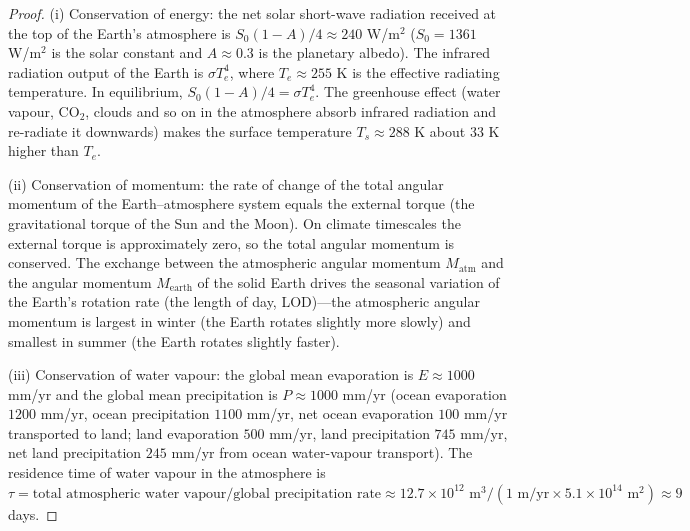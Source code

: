 \begin{proof}
(i) Conservation of energy: the net solar short-wave radiation received at the top of the Earth's atmosphere is $S_0(1-A)/4 \approx 240$ W/m$^2$ ($S_0 = 1361$ W/m$^2$ is the solar constant and $A \approx 0.3$ is the planetary albedo). The infrared radiation output of the Earth is $\sigma T_e^4$, where $T_e \approx 255$ K is the effective radiating temperature. In equilibrium, $S_0(1-A)/4 = \sigma T_e^4$. The greenhouse effect (water vapour, CO$_2$, clouds and so on in the atmosphere absorb infrared radiation and re-radiate it downwards) makes the surface temperature $T_s \approx 288$ K about $33$ K higher than $T_e$.

(ii) Conservation of momentum: the rate of change of the total angular momentum of the Earth--atmosphere system equals the external torque (the gravitational torque of the Sun and the Moon). On climate timescales the external torque is approximately zero, so the total angular momentum is conserved. The exchange between the atmospheric angular momentum $M_{\text{atm}}$ and the angular momentum $M_{\text{earth}}$ of the solid Earth drives the seasonal variation of the Earth's rotation rate (the length of day, LOD)---the atmospheric angular momentum is largest in winter (the Earth rotates slightly more slowly) and smallest in summer (the Earth rotates slightly faster).

(iii) Conservation of water vapour: the global mean evaporation is $E \approx 1000$ mm/yr and the global mean precipitation is $P \approx 1000$ mm/yr (ocean evaporation $1200$ mm/yr, ocean precipitation $1100$ mm/yr, net ocean evaporation $100$ mm/yr transported to land; land evaporation $500$ mm/yr, land precipitation $745$ mm/yr, net land precipitation $245$ mm/yr from ocean water-vapour transport). The residence time of water vapour in the atmosphere is $\tau = \text{total atmospheric water vapour}/\text{global precipitation rate} \approx 12.7 \times 10^{12} \text{ m}^3 / (1 \text{ m/yr} \times 5.1 \times 10^{14} \text{ m}^2) \approx 9$ days.
\end{proof}

